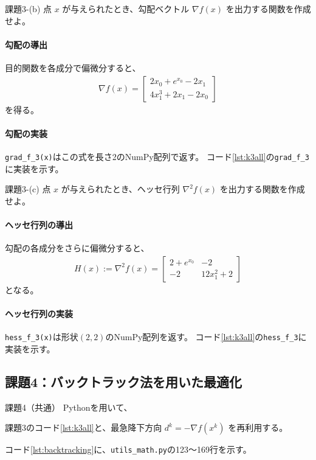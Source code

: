 \documentclass[a4j]{jarticle}
\begin{document}
\begin{itembox}[l]{課題3-(b)}
点 $x$ が与えられたとき、勾配ベクトル $\nabla f(x)$ を出力する関数を作成せよ。
\end{itembox}
\paragraph{勾配の導出}
目的関数を各成分で偏微分すると、
\begin{align}
  \nabla f(x)=\begin{bmatrix}2x_0+e^{x_0}-2x_1\\4x_1^3+2x_1-2x_0\end{bmatrix}
  \label{eq:gradient3}
\end{align}
を得る。

\paragraph{勾配の実装}
\texttt{grad\_f\_3(x)}はこの式を長さ2のNumPy配列で返す。
コード\ref{lst:k3all}の\texttt{grad\_f\_3}に実装を示す。


\begin{itembox}[l]{課題3-(c)}
点 $x$ が与えられたとき、ヘッセ行列 $\nabla^2f(x)$ を出力する関数を作成せよ。
\end{itembox}
\paragraph{ヘッセ行列の導出}
勾配の各成分をさらに偏微分すると、
\begin{align}
  H(x):=\nabla^2 f(x)=\begin{bmatrix}2+e^{x_0}&-2\\-2&12x_1^2+2\end{bmatrix}
  \label{eq:hessian3}
\end{align}
となる。

\paragraph{ヘッセ行列の実装}
\texttt{hess\_f\_3(x)}は形状$(2,2)$のNumPy配列を返す。
コード\ref{lst:k3all}の\texttt{hess\_f\_3}に実装を示す。


\subsection{課題4：バックトラック法を用いた最適化}
\begin{itembox}[l]{課題4（共通）}
Pythonを用いて、
\end{itembox}
課題3のコード\ref{lst:k3all}と、最急降下方向 $d^k=-\nabla f(x^k)$ を再利用する。
\par\noindent
コード\ref{lst:backtracking}に、\texttt{utils\_math.py}の123〜169行を示す。
\par

\end{document}
